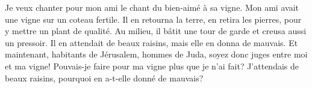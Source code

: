 Je veux chanter pour mon ami le chant du bien-aimé à sa vigne.
Mon ami avait une vigne sur un coteau fertile.
	Il en retourna la terre, en retira les pierres,
	pour y mettre un plant de qualité.
Au milieu, il bâtit une tour de garde et creusa aussi un pressoir.
	Il en attendait de beaux raisins, mais elle en donna de mauvais.
Et maintenant, habitants de Jérusalem, hommes de Juda,
	soyez donc juges entre moi et ma vigne!
	Pouvais-je faire pour ma vigne plus que je n’ai fait?
	J’attendais de beaux raisins, pourquoi en a-t-elle donné de mauvais?

